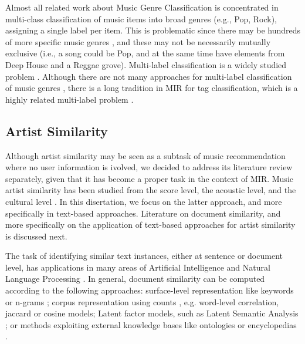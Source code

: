 Almost all related work about Music Genre Classification is concentrated in multi-class classification of music items into broad genres (e.g., Pop, Rock), assigning a single label per item. This is problematic since there may be hundreds of more specific music genres \citep{pachet2000taxonomy}, and these may not be necessarily mutually exclusive (i.e., a song could be Pop, and at the same time have elements from Deep House and a Reggae grove). 
Multi-label classification is a widely studied problem \citep{tsoumakas2006multi,jain2016extreme}. 
Although there are not many approaches for multi-label classification of music genres \citep{Sanden2011,wang2009tag}, there is a long tradition in MIR for tag classification, which is a highly related multi-label problem \citep{Choi2016,wang2009tag}.


\subsection{Artist Similarity}
\label{sec:SOA:mir:similarity}

Although artist similarity may be seen as a subtask of music recommendation where no user information is ivolved, we decided to address its literature review separately, given that it has become a proper task in the context of MIR.
Music artist similarity has been studied from the score level, the acoustic level, and the cultural level \citep{Ellis2002}. In this disertation, we focus on the latter approach, and more specifically in text-based approaches. Literature on document similarity, and more specifically on the application of text-based approaches for artist similarity is discussed next.

The task of identifying similar text instances, either at sentence or document level, has applications in many areas of Artificial Intelligence and Natural Language Processing \citep{LiuandWang2014}. In general, document similarity can be computed according to the following approaches: surface-level representation like keywords or n-grams \citep{ChimandDeng2008}; corpus representation using counts \citep{Rorvig1999}, e.g. word-level correlation, jaccard or cosine models; Latent factor models, such as Latent Semantic Analysis \citep{Deerwesteretal1990}; or methods exploiting external knowledge bases like ontologies or encyclopedias \citep{Huetal2009}.

